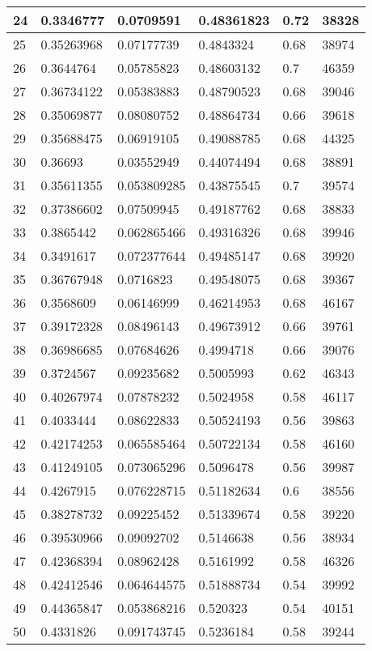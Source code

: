 \begin{longtable}{|l|l|l|l|l|l|}
24 & 0.3346777 & 0.0709591 & 0.48361823 & 0.72 & 38328 \\ \hline 
25 & 0.35263968 & 0.07177739 & 0.4843324 & 0.68 & 38974 \\ \hline 
26 & 0.3644764 & 0.05785823 & 0.48603132 & 0.7 & 46359 \\ \hline 
27 & 0.36734122 & 0.05383883 & 0.48790523 & 0.68 & 39046 \\ \hline 
28 & 0.35069877 & 0.08080752 & 0.48864734 & 0.66 & 39618 \\ \hline 
29 & 0.35688475 & 0.06919105 & 0.49088785 & 0.68 & 44325 \\ \hline 
30 & 0.36693 & 0.03552949 & 0.44074494 & 0.68 & 38891 \\ \hline 
31 & 0.35611355 & 0.053809285 & 0.43875545 & 0.7 & 39574 \\ \hline 
32 & 0.37386602 & 0.07509945 & 0.49187762 & 0.68 & 38833 \\ \hline 
33 & 0.3865442 & 0.062865466 & 0.49316326 & 0.68 & 39946 \\ \hline 
34 & 0.3491617 & 0.072377644 & 0.49485147 & 0.68 & 39920 \\ \hline 
35 & 0.36767948 & 0.0716823 & 0.49548075 & 0.68 & 39367 \\ \hline 
36 & 0.3568609 & 0.06146999 & 0.46214953 & 0.68 & 46167 \\ \hline 
37 & 0.39172328 & 0.08496143 & 0.49673912 & 0.66 & 39761 \\ \hline 
38 & 0.36986685 & 0.07684626 & 0.4994718 & 0.66 & 39076 \\ \hline 
39 & 0.3724567 & 0.09235682 & 0.5005993 & 0.62 & 46343 \\ \hline 
40 & 0.40267974 & 0.07878232 & 0.5024958 & 0.58 & 46117 \\ \hline 
41 & 0.4033444 & 0.08622833 & 0.50524193 & 0.56 & 39863 \\ \hline 
42 & 0.42174253 & 0.065585464 & 0.50722134 & 0.58 & 46160 \\ \hline 
43 & 0.41249105 & 0.073065296 & 0.5096478 & 0.56 & 39987 \\ \hline 
44 & 0.4267915 & 0.076228715 & 0.51182634 & 0.6 & 38556 \\ \hline 
45 & 0.38278732 & 0.09225452 & 0.51339674 & 0.58 & 39220 \\ \hline 
46 & 0.39530966 & 0.09092702 & 0.5146638 & 0.56 & 38934 \\ \hline 
47 & 0.42368394 & 0.08962428 & 0.5161992 & 0.58 & 46326 \\ \hline 
48 & 0.42412546 & 0.064644575 & 0.51888734 & 0.54 & 39992 \\ \hline 
49 & 0.44365847 & 0.053868216 & 0.520323 & 0.54 & 40151 \\ \hline 
50 & 0.4331826 & 0.091743745 & 0.5236184 & 0.58 & 39244 \\ \hline 
\end{longtable}